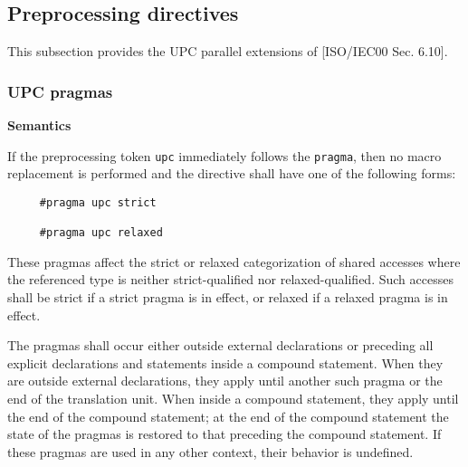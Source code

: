 \subsection{Preprocessing directives}

\npf This subsection provides the UPC parallel extensions of
   [ISO/IEC00 Sec. 6.10].

\subsubsection{UPC pragmas}
\label{pragmas}
{\bf Semantics} 

\npf If the preprocessing token {\tt upc} immediately follows
    the {\tt pragma}, then no macro replacement is performed and the
    directive shall have one of the following forms:

\begin{verbatim}
     #pragma upc strict

     #pragma upc relaxed 
\end{verbatim}
 

\np These pragmas affect the strict or relaxed
    categorization of shared accesses where the
    referenced type is neither strict-qualified nor
    relaxed-qualified. Such accesses shall be strict if a strict
    pragma is in effect, or relaxed if a relaxed pragma is in effect.

\np %

\np The pragmas shall occur either outside external
    declarations or preceding all explicit declarations and statements
    inside a compound statement.  When they are outside external
    declarations, they apply until another such pragma or the end of
    the translation unit.  When inside a compound statement, they
    apply until the end of the compound statement; at the end of the
    compound statement the state of the pragmas is restored to that
    preceding the compound statement.  If these pragmas are used in
    any other context, their behavior is undefined.

